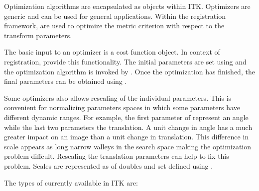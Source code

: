 

Optimization algorithms are encapsulated as  objects
within ITK. Optimizers are generic and can be used for general applications.
Within the registration framework, 
are used to optimize the metric criterion with respect to the transform parameters.


The basic input to an optimizer is a cost function object. In context
of registration,  provide this functionality.
The initial parameters are set using  and
the optimization algorithm is invoked by .
Once the optimization has finished, the final parameters can be obtained
using .

Some optimizers also allows rescaling of the individual parameters. This
is convenient for normalizing parameters spaces in which some parameters
have different dynamic ranges. For example, the first parameter of
 represent an angle while the last two parameters
the translation. A unit change in angle has a much greater impact on
an image than a unit change in translation. This difference in scale appears
as long narrow valleys in the search space making the optimization problem
diffcult. Rescaling the translation parameters can help to fix this problem.
Scales are represented as  of doubles and set defined using
.

The types of  currently available
in ITK are:

